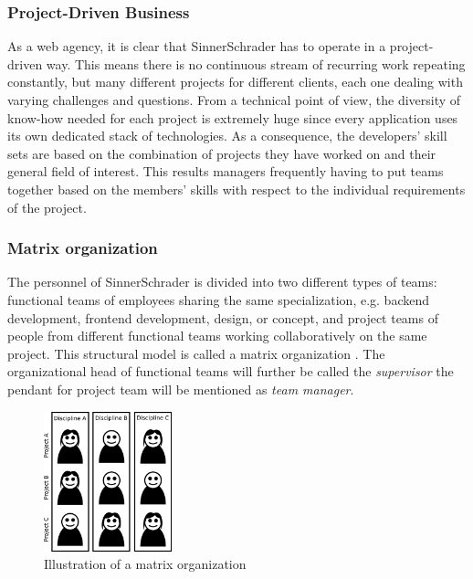 \subsubsection{Project-Driven Business}
As a web agency, it is clear that SinnerSchrader has to operate in a project-driven way. This means there is no continuous stream of recurring work repeating constantly, but many different projects for different clients, each one dealing with varying challenges and questions. From a technical point of view, the diversity of know-how needed for each project is extremely huge since every application uses its own dedicated stack of technologies. As a consequence, the developers’ skill sets are based on the combination of projects they have worked on and their general field of interest. This results managers frequently having to put teams together based on the members’ skills with respect to the individual requirements of the project.

\subsubsection{Matrix organization}
The personnel of SinnerSchrader is divided into two different types of teams: functional teams of
employees sharing the same specialization, e.g. backend development, frontend development, design, or concept, and project teams of people from different functional teams working collaboratively on the same project. This structural model is called a matrix organization \cite[P. 75]{BWL}.
The organizational head of functional teams will further be called the \textit{supervisor} the pendant for project team will be mentioned as \textit{team manager}.

\begin{figure}[!htp]
    \centering
    \includegraphics[width=0.33\textwidth]{images/matrixorga.png}
    \caption[Diagram: Matrix organization]{Illustration of a matrix organization}
    \label{fig:matrixorga}
\end{figure}




